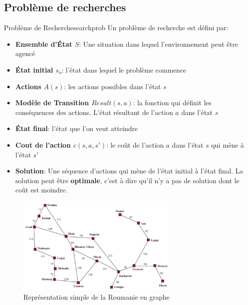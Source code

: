 \subsection{Problème de recherches} %
\label{sub:probleme_de_recherches}

\begin{definition}{Problème de Recherche}{searchprob}
    Un problème de recherche est défini par:
    \begin{itemize}
        \item \textbf{Ensemble d'État $S$}: Une situation dans lequel l'environnement peut être agencé
        \item \textbf{État initial $s_o$}: l'état dans lequel le problème commence
        \item \textbf{Actions $A(s)$}: les actions possibles dans l'état $s$
        \item \textbf{Modèle de Transition $Result(s, a)$}: la fonction qui définit les conséquences des actions. L'état résultant de l'action $a$ dans l'état $s$
        \item \textbf{État final}: l'état que l'on veut atteindre
        \item \textbf{Cout de l'action $c(s, a, s')$}: le coût de l'action $a$ dans l'état $s$ qui mène à l'état $s'$
        \item \textbf{Solution}: Une séquence d'actions qui mène de l'état initial à l'état final. La solution 
            peut être \textbf{optimale}, c'est à dire qu'il n'y a pas de solution dont le coût est moindre.
    \end{itemize}
\end{definition}


\begin{figure}[H]
    \begin{center}
        \includegraphics[width=0.70\textwidth]{pictures/roumanie.png}
    \end{center}
    \caption{Représentation simple de la Roumanie en graphe}\label{fig:romania}
\end{figure}



